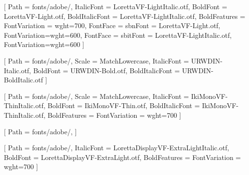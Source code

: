 \usepackage{fontspec}

\setmainfont{LorettaVF-Light.otf}[
    Path           = fonts/adobe/,
    ItalicFont     = LorettaVF-LightItalic.otf,
    BoldFont       = LorettaVF-Light.otf,
    BoldItalicFont = LorettaVF-LightItalic.otf,
    BoldFeatures   = {FontVariation = {wght=700}},
    FontFace       = {sb}{n}{Font = LorettaVF-Light.otf, FontVariation={wght=600}},
    FontFace       = {sb}{it}{Font = LorettaVF-LightItalic.otf, FontVariation={wght=600}}
]

\setsansfont{URWDIN-Regular.otf}[
    Path           = fonts/adobe/,
    Scale          = MatchLowercase,
    ItalicFont     = URWDIN-Italic.otf,
    BoldFont       = URWDIN-Bold.otf,
    BoldItalicFont = URWDIN-BoldItalic.otf
]

\setmonofont{IkiMonoVF-Thin.otf}[
    Path           = fonts/adobe/,
    Scale          = MatchLowercase,
    ItalicFont     = IkiMonoVF-ThinItalic.otf,
    BoldFont       = IkiMonoVF-Thin.otf,
    BoldItalicFont = IkiMonoVF-ThinItalic.otf,
    BoldFeatures   = {FontVariation = {wght=700}}
]

\newfontfamily{}[
    Path         = fonts/adobe/,
]

\newfontfamily{}[
    Path         = fonts/adobe/,
    ItalicFont   = LorettaDisplayVF-ExtraLightItalic.otf,
    BoldFont     = LorettaDisplayVF-ExtraLight.otf,
    BoldFeatures = {FontVariation = {wght=700}}
]

\newcommand{\dinfont}{\sffamily}